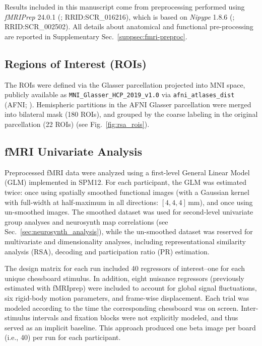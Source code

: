 \documentclass[preprint,12pt]{elsarticle}
\begin{document}
Results included in this manuscript come from preprocessing performed using \emph{fMRIPrep} 24.0.1 (\cite{fmriprep1, fmriprep2}; RRID:SCR\_016216), which is based on \emph{Nipype} 1.8.6 (\cite{nipype1, nipype2}; RRID:SCR\_002502). All details about anatomical and functional pre-processing are reported in Supplementary Sec.~\ref{suppsec:fmri-preproc}.

\subsection{Regions of Interest (ROIs)}\label{sec:rois}
The ROIs were defined via the Glasser parcellation \cite{glasser2016multi} projected into MNI space, publicly available as \texttt{MNI\_Glasser\_HCP\_2019\_v1.0} via \texttt{afni\_atlases\_dist} (AFNI; \cite{cox1996afni}). Hemispheric partitions in the AFNI Glasser parcellation were merged into bilateral mask (180 ROIs), and grouped by the coarse labeling in the original parcellation (22 ROIs) \cite{glasser2016multi} (see Fig.~\ref{fig:rsa_rois}).

\subsection{fMRI Univariate Analysis}\label{sec:fmri_glm}
Preprocessed fMRI data were analyzed using a first-level General Linear Model (GLM) implemented in SPM12. For each participant, the GLM was estimated twice: once using spatially smoothed functional images (with a Gaussian kernel with full-width at half-maximum in all directions: $[4, 4, 4]$\,mm), and once using un-smoothed images. The smoothed dataset was used for second-level univariate group analyses and neurosynth map correlations (see Sec.~\ref{sec:neurosynth_analysis}), while the un-smoothed dataset was reserved for multivariate and dimensionality analyses, including representational similarity analysis (RSA), decoding and participation ratio (PR) estimation.

The design matrix for each run included 40 regressors of interest--one for each unique chessboard stimulus. In addition, eight nuisance regressors (previously estimated with fMRIprep) were included to account for global signal fluctuations, six rigid-body motion parameters, and frame-wise displacement. Each trial was modeled according to the time the corresponding chessboard was on screen. Inter-stimulus intervals and fixation blocks were not explicitly modeled, and thus served as an implicit baseline. This approach produced one beta image per board (i.e., 40) per run for each participant.
\end{document}
